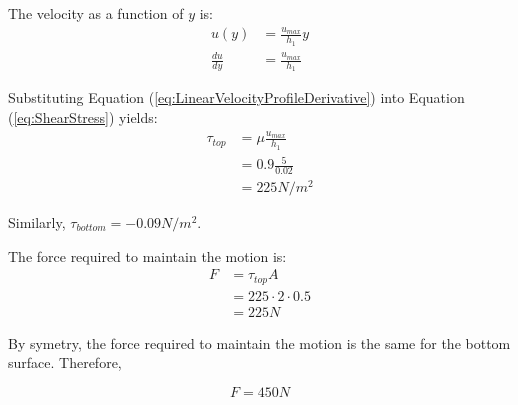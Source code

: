 The velocity as a function of $y$ is:
\begin{align}
    u(y) &= \frac{u_{max}}{h_1}y \label{eq:LinearVelocityProfile} \\
    \frac{du}{dy} &= \frac{u_{max}}{h_1} \label{eq:LinearVelocityProfileDerivative}
\end{align}

Substituting Equation (\ref{eq:LinearVelocityProfileDerivative}) into Equation
(\ref{eq:ShearStress}) yields:
\begin{align}
    \tau_{top} &= \mu \frac{u_{max}}{h_1} \nonumber \\
        &= 0.9 \frac{5}{0.02} \nonumber \\
        &= 225 \unit{N/m^2} \nonumber
\end{align}

Similarly, $\tau_{bottom} = -0.09 \unit{N/m^2}$.

The force required to maintain the motion is:
\begin{align}
    F &= \tau_{top} A \nonumber \\
        &= 225 \cdot 2 \cdot 0.5 \nonumber \\
        &= 225 \unit{N} \nonumber
\end{align}

By symetry, the force required to maintain the motion is the same for the
bottom surface. Therefore,

\begin{equation*}
    \boxed{F = 450 \unit{N}}
\end{equation*}









